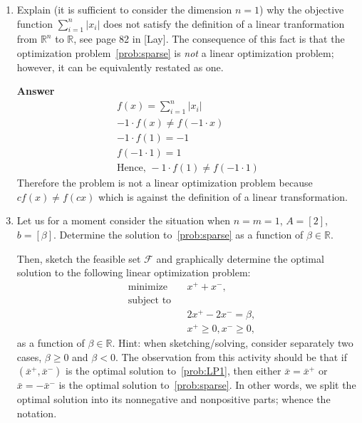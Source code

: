 \documentclass[10pt,a4paper]{article}
\theoremstyle{plain}
\theoremstyle{definition}
\begin{document}
\begin{enumerate}
\item
Explain (it is sufficient to consider the dimension \(n=1\)) why the objective function \(\sum_{i=1}^n |x_i|\) does not satisfy the definition of a linear tranformation from \(\mathbb{R}^n\) to \(\mathbb{R}\), see page 82 in [Lay].
The consequence of this fact is that the optimization problem~\eqref{prob:sparse} is \emph{not} a linear optimization problem; however, it can be equivalently restated as one.
\item[\textbf{Answer}]
  \begin{align*}
    f(x)=\sum_{i=1}^n|x_i| \\
    -1 \cdot f(x) \neq f(-1\cdot x) \\
    -1 \cdot f(1) = -1 \\
    f(-1 \cdot 1) = 1 \\
    \text{Hence, }-1\cdot f(1) \neq f(-1 \cdot 1)
  \end{align*}
  Therefore the problem is not a linear optimization problem because $cf(x) \neq f(cx)$ which is against the definition of a linear transformation.
\item
Let us for a moment consider the situation when \(n=m=1\), \(A=[2]\), \(b=[\beta]\).
Determine the solution to~\eqref{prob:sparse} as a function of \(\beta\in\mathbb{R}\).

Then, sketch the feasible set $\mathcal{F}$ and graphically determine the optimal solution to the following linear optimization problem:
\begin{equation}\label{prob:LP1}\begin{aligned}
&\text{minimize} && x^+ + x^-,\\
&\text{subject to}&&\\
&&& 2 x^+ - 2x^- = \beta,\\
&&& x^+\geq 0, x^-\geq 0,
\end{aligned}\end{equation}
as a function of \(\beta\in\mathbb{R}\).
Hint: when sketching/solving, consider separately two cases,
\(\beta \geq 0\) and \(\beta < 0\).
The observation from this activity should be that if \((\bar{x}^+,\bar{x}^-)\) is the optimal solution to~\eqref{prob:LP1}, then either \(\bar{x}=\bar{x}^+\)
or \(\bar{x}= -\bar{x}^-\) is the optimal solution to~\eqref{prob:sparse}.
In other words, we split the optimal solution into its nonnegative and nonpositive parts; whence the notation.


\end{enumerate}
\end{document}
